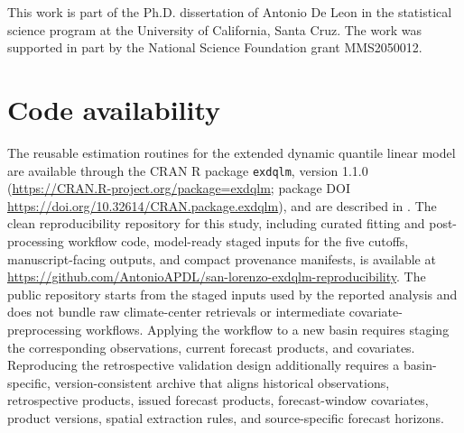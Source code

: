 \documentclass[APA,STIX1COL]{WileyNJD-v2}
\begin{document}
This work is part of the Ph.D. dissertation of Antonio De Leon in the statistical science program at the University of California, Santa Cruz. The work was supported in part by the National Science
Foundation grant MMS2050012.

\section*{Code availability}

The reusable estimation routines for the extended dynamic quantile linear model are available through the CRAN R package \texttt{exdqlm}, version 1.1.0 (\url{https://CRAN.R-project.org/package=exdqlm}; package DOI \url{https://doi.org/10.32614/CRAN.package.exdqlm}), and are described in \citet{deleon2026exdqlm}. The clean reproducibility repository for this study, including curated fitting and post-processing workflow code, model-ready staged inputs for the five cutoffs, manuscript-facing outputs, and compact provenance manifests, is available at \url{https://github.com/AntonioAPDL/san-lorenzo-exdqlm-reproducibility}.
The public repository starts from the staged inputs used by the reported analysis and does not bundle raw climate-center retrievals or intermediate covariate-preprocessing workflows. Applying the workflow to a new basin requires staging the corresponding observations, current forecast products, and covariates. Reproducing the retrospective validation design additionally requires a basin-specific, version-consistent archive that aligns historical observations, retrospective products, issued forecast products, forecast-window covariates, product versions, spatial extraction rules, and source-specific forecast horizons.





\end{document}
